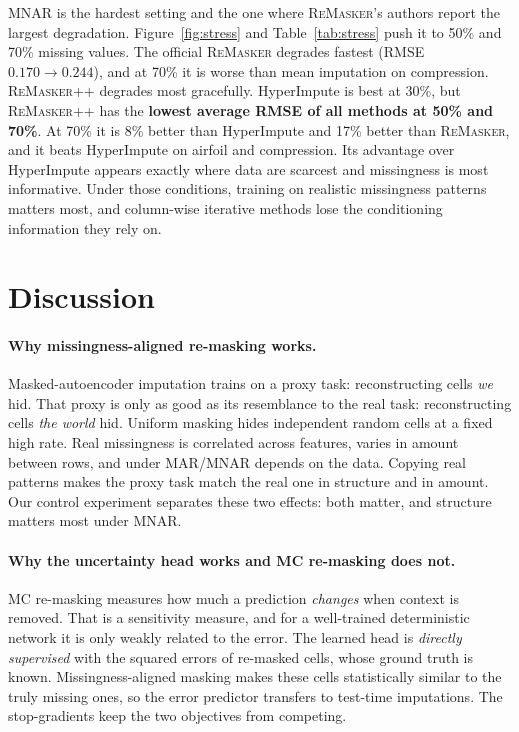\documentclass[11pt]{article}
\newcommand{\rmpp}{\textsc{ReMasker++}}
\newcommand{\remasker}{\textsc{ReMasker}}
\begin{document}
MNAR is the hardest setting and the one where \remasker's authors report the largest degradation. Figure~\ref{fig:stress} and Table~\ref{tab:stress} push it to 50\% and 70\% missing values. The official \remasker{} degrades fastest (RMSE $0.170\to0.244$), and at 70\% it is worse than mean imputation on compression. \rmpp{} degrades most gracefully. HyperImpute is best at 30\%, but \rmpp{} has the \textbf{lowest average RMSE of all methods at 50\% and 70\%}. At 70\% it is 8\% better than HyperImpute and 17\% better than \remasker, and it beats HyperImpute on airfoil and compression. Its advantage over HyperImpute appears exactly where data are scarcest and missingness is most informative. Under those conditions, training on realistic missingness patterns matters most, and column-wise iterative methods lose the conditioning information they rely on.

\section{Discussion}
\paragraph{Why missingness-aligned re-masking works.} Masked-autoencoder imputation trains on a proxy task: reconstructing cells \emph{we} hid. That proxy is only as good as its resemblance to the real task: reconstructing cells \emph{the world} hid. Uniform masking hides independent random cells at a fixed high rate. Real missingness is correlated across features, varies in amount between rows, and under MAR/MNAR depends on the data. Copying real patterns makes the proxy task match the real one in structure and in amount. Our control experiment separates these two effects: both matter, and structure matters most under MNAR.

\paragraph{Why the uncertainty head works and MC re-masking does not.} MC re-masking measures how much a prediction \emph{changes} when context is removed. That is a sensitivity measure, and for a well-trained deterministic network it is only weakly related to the error. The learned head is \emph{directly supervised} with the squared errors of re-masked cells, whose ground truth is known. Missingness-aligned masking makes these cells statistically similar to the truly missing ones, so the error predictor transfers to test-time imputations. The stop-gradients keep the two objectives from competing.
\end{document}
